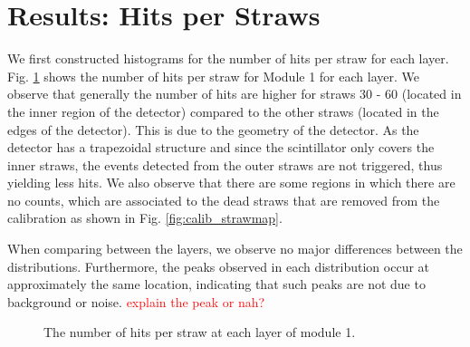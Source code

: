 \documentclass[a4paper]{report}
\numberwithin{equation}{section}
\begin{document}
\section{Results: Hits per Straws}

We first constructed histograms for the number of hits per straw for each layer. Fig. \ref{fig:hitsperstraw_m1_layers} shows the number of hits per straw for 
Module 1 for each layer. We observe that generally the number of hits are higher for straws 30 - 60 (located in the inner region of the 
detector) compared to the other straws (located in the edges of the detector). 
This is due to the geometry of the detector. As the detector has a trapezoidal structure and since the scintillator only covers
the inner straws, the events detected from the outer straws are not triggered, thus yielding less hits. We also observe that there are 
some regions in which there are no counts, which are associated to the dead straws that are removed from the calibration as shown in 
Fig. \ref{fig:calib_strawmap}. \par 

When comparing between the layers, we observe no major differences between the distributions. Furthermore, the peaks observed 
in each distribution occur at approximately the same location, indicating that such peaks are not due to background or noise. 
\textcolor{red}{explain the peak or nah?} \par 


\begin{figure}[htb!]
	\centering
	\quad
	\centering
	\quad
	\centering
	\caption{The number of hits per straw at each layer of module 1. }
	\label{fig:hitsperstraw_m1_layers}
\end{figure}
\end{document}
